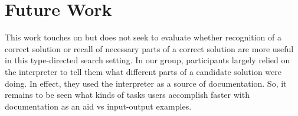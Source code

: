 \section{Future Work}
\label{sec:future}

This work touches on but does not seek to evaluate whether recognition of a
correct solution or recall of necessary parts of a correct solution are more
useful in this type-directed search setting.
%
In our \noexamples group, participants largely relied on the interpreter to tell
them what different parts of a candidate solution were doing.
%
In effect, they used the interpreter as a source of documentation.
%
So, it remains to be seen what kinds of tasks users accomplish faster with
documentation as an aid vs input-output examples.
